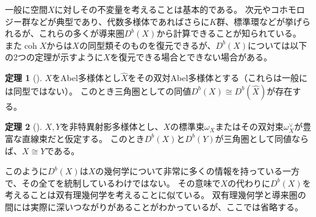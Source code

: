 \documentclass[a4j,uplatex,dvipdfmx]{jsarticle}
\numberwithin{equation}{section}
\numberwithin{figure}{section}
\theoremstyle{definition}
\newtheorem{theorem}{定理}[section]
\DeclareMathOperator{\coh}{\mathrm{coh}}
\begin{document}
一般に空間$X$に対しその不変量を考えることは基本的である。
次元やコホモロジー群などが典型であり、代数多様体であればさらに$K$群、標準環などが挙げられるが、これらの多くが導来圏$D^b(X)$から計算できることが知られている。
また$\coh X$からは$X$の同型類そのものを復元できるが、$D^b(X)$については以下の2つの定理が示すように$X$を復元できる場合とできない場合がある。
\begin{theorem}[\cite{MR607081}]\label{thm:mukai}
    $X$をAbel多様体とし$\hat{X}$をその双対Abel多様体とする（これらは一般には同型ではない）。
    このとき三角圏としての同値$D^b(X) \cong D^b(\hat{X})$が存在する。
\end{theorem}
\begin{theorem}[\cite{MR1818984}]
    $X, Y$を非特異射影多様体とし、$X$の標準束$\omega_X$またはその双対束$\omega_X^\vee$が豊富な直線束だと仮定する。
    このとき$D^b(X)$と$D^b(Y)$が三角圏として同値ならば、$X\cong Y$である。
\end{theorem}
このように$D^b(X)$は$X$の幾何学について非常に多くの情報を持っている一方で、その全てを統制しているわけではない。
その意味で$X$の代わりに$D^b(X)$を考えることは双有理幾何学を考えることに似ている。
双有理幾何学と導来圏の間には実際に深いつながりがあることがわかっているが、ここでは省略する。
\end{document}
